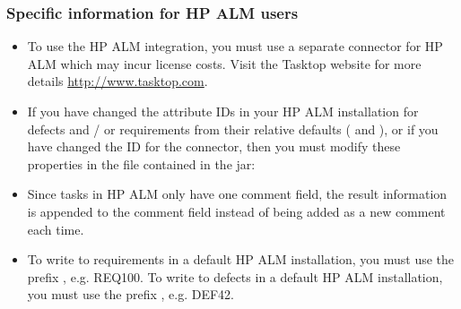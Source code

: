 \subsubsection{Specific information for HP ALM users}
\begin{itemize}
\item To use the HP ALM integration, you must use a separate connector for HP ALM which may incur license costs. Visit the Tasktop website for more details \url{http://www.tasktop.com}.
\item If you have changed the attribute IDs in your HP ALM installation for defects and / or requirements from their relative defaults ( and ), or if you have changed the ID for the connector, then you must modify these properties in the  file contained in the jar:\\
\item Since tasks in HP ALM only have one comment field, the result information is appended to the comment field instead of being added as a new comment each time.
\item To write to requirements in a default HP ALM installation, you must use the prefix , e.g. REQ100. To write to defects in a default HP ALM installation, you must use the prefix , e.g. DEF42.
\end{itemize}


